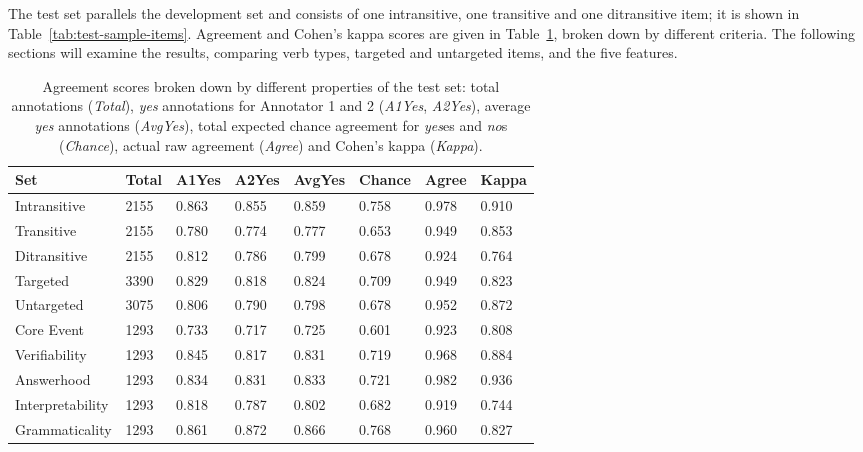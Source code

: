 The test set parallels the development set and consists of one intransitive, one transitive and one ditransitive item; it is shown in Table~\ref{tab:test-sample-items}. Agreement and Cohen's kappa scores are given in Table~\ref{tab:agreement}, broken down by different criteria.  The following sections will examine the results, comparing verb types, targeted and untargeted items, and the five features.

\begin{table}[htb!]
\begin{center}
\begin{tabular}{|l|l|l|l|l||l|l||l|}
\hline
Set	& Total	& A1Yes & A2Yes & AvgYes & Chance & Agree & Kappa \\
\hline
\hline
Intransitive & 2155 & 0.863 & 0.855 & 0.859 & 0.758 & 0.978 & 0.910 \\
\hline
Transitive & 2155 & 0.780 & 0.774 & 0.777 & 0.653 & 0.949 & 0.853 \\
\hline
Ditransitive & 2155 & 0.812 & 0.786 & 0.799 & 0.678 & 0.924 & 0.764 \\ 
\hline
\hline
Targeted & 3390 & 0.829 & 0.818 & 0.824 & 0.709 & 0.949 & 0.823 \\
\hline
Untargeted & 3075 & 0.806 & 0.790 & 0.798 & 0.678 & 0.952 & 0.872 \\
\hline
\hline
Core Event & 1293 & 0.733 & 0.717 & 0.725 & 0.601 & 0.923 & 0.808 \\
\hline
Verifiability & 1293 & 0.845 & 0.817 & 0.831 & 0.719 & 0.968 & 0.884 \\
\hline
Answerhood & 1293 & 0.834 & 0.831 & 0.833 & 0.721 & 0.982 & 0.936 \\
\hline
Interpretability & 1293 & 0.818 & 0.787 & 0.802 & 0.682 & 0.919 & 0.744 \\
\hline
Grammaticality & 1293 & 0.861 & 0.872 & 0.866 & 0.768 & 0.960 & 0.827 \\
\hline
\end{tabular}
\caption{\label{tab:agreement} Agreement scores broken down by different properties of the test set: total annotations (\textit{Total}), \textit{yes} annotations for Annotator 1 and 2 (\textit{A1Yes}, \textit{A2Yes}), average \textit{yes} annotations (\textit{AvgYes}), total expected chance agreement for \textit{yes}es and \textit{no}s (\textit{Chance}), actual raw agreement (\textit{Agree}) and Cohen's kappa (\textit{Kappa}).}
\end{center}
\end{table}


